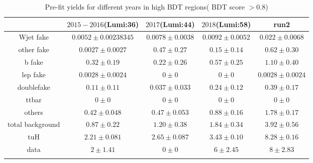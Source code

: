 \begin{table}[H]
\caption{Pre-fit yields for different years in high BDT regions( BDT score $>0.8$) }
\label{tab:pre_fit_diff_year_1}
\centering
\footnotesize
\begin{tabular}{ccccc} \toprule\toprule
& $2015-2016$(Lumi:36) & $2017$(Lumi:44)  & $2018$(Lumi:58)  & run2 \\\midrule

Wjet fake&	         $0.0052\pm0.00238345$  & $0.0078\pm0.0038$    & $0.0092\pm0.0052$   &$0.022\pm0.0068$\\    
other fake&	         $0.0027\pm0.0027$ 		& $0.47\pm0.27$        & $0.15\pm0.14$        &$0.62\pm0.30$\\
b fake&		         $0.32\pm0.19$     & $0.22\pm0.26$       & $0.57\pm0.25$        &$1.10\pm0.40$\\
lep fake&	         $0.0028\pm0.0024$ & $0\pm0$                     & $0\pm0$     &$0.0028\pm0.0024$\\
doublefake&	         $0.11\pm0.11$       & $0.037\pm0.033$     & $0.24\pm0.12$        &$0.39\pm0.17$\\
ttbar&		         $0\pm0$                   & $0\pm0$          & $0\pm0$          &$0\pm0$\\
others&              $0.42\pm0.048$    & $0.47\pm0.053$       & $0.88\pm0.16$       &$1.78\pm0.17$\\
total background &   $0.87\pm0.22$     & $1.20\pm0.38$        & $1.84\pm0.34$        &$3.92\pm0.56$    \\
tuH&			     $2.21\pm0.081$     & $2.65\pm0.087$       & $3.43\pm0.10$        &$8.28\pm0.16$\\    
data&		         $2\pm1.41$             & $0\pm0$                     & $6\pm2.45$  &$8\pm2.83$\\

\bottomrule\bottomrule\\
\end{tabular}
\end{table}


